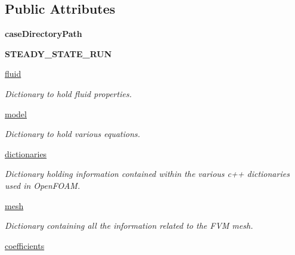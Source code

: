 \subsection*{Public Attributes}
\begin{DoxyCompactItemize}
\item 
\mbox{\label{classpy_f_v_m_1_1_region_1_1_region_a8d325f8a7462a2cc6d3474432971cded}} 
{\bfseries case\+Directory\+Path}
\item 
\mbox{\label{classpy_f_v_m_1_1_region_1_1_region_a026764520c95da4c7af5b408e49ef491}} 
{\bfseries S\+T\+E\+A\+D\+Y\+\_\+\+S\+T\+A\+T\+E\+\_\+\+R\+UN}
\item 
\mbox{\hyperlink{classpy_f_v_m_1_1_region_1_1_region_a18bfc9b2d9c9bd6403db21b5b458a7ac}{fluid}}
\begin{DoxyCompactList}\small\item\em Dictionary to hold \textquotesingle{}fluid\textquotesingle{} properties. \end{DoxyCompactList}\item 
\mbox{\label{classpy_f_v_m_1_1_region_1_1_region_a1e511f8c07f166d8ef7ca5a28a9f8a9b}} 
\mbox{\hyperlink{classpy_f_v_m_1_1_region_1_1_region_a1e511f8c07f166d8ef7ca5a28a9f8a9b}{model}}
\begin{DoxyCompactList}\small\item\em Dictionary to hold various equations. \end{DoxyCompactList}\item 
\mbox{\hyperlink{classpy_f_v_m_1_1_region_1_1_region_addeb33384d08febd9d7ed462c1e93bed}{dictionaries}}
\begin{DoxyCompactList}\small\item\em Dictionary holding information contained within the various c++ dictionaries used in Open\+F\+O\+AM. \end{DoxyCompactList}\item 
\mbox{\hyperlink{classpy_f_v_m_1_1_region_1_1_region_a2a569d069162a54de1c13f2ba72ce2df}{mesh}}
\begin{DoxyCompactList}\small\item\em Dictionary containing all the information related to the F\+VM mesh. \end{DoxyCompactList}\item 
\mbox{\hyperlink{classpy_f_v_m_1_1_region_1_1_region_a6f91d0e074a2b28b8ed05a00a37cb4f3}{coefficients}}

\end{DoxyCompactItemize}
